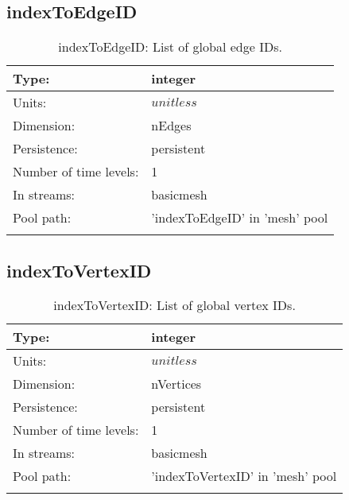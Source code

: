 \subsection[indexToEdgeID]{indexToEdgeID}
\label{subsec:var_sec_mesh_indexToEdgeID}
\begin{center}
\begin{longtable}{| p{2.0in} | p{4.0in} |}
        \hline 
        Type: & integer \\
        \hline 
        Units: & $unitless$ \\
        \hline 
        Dimension: & nEdges \\
        \hline 
        Persistence: & persistent \\
        \hline 
        Number of time levels: & 1 \\
        \hline 
		 In streams: &  basicmesh \\
        \hline 
            Pool path: & 'indexToEdgeID' in 'mesh' pool
 \\
		 \hline 
    \caption{indexToEdgeID: List of global edge IDs.}
\end{longtable}
\end{center}
\subsection[indexToVertexID]{indexToVertexID}
\label{subsec:var_sec_mesh_indexToVertexID}
\begin{center}
\begin{longtable}{| p{2.0in} | p{4.0in} |}
        \hline 
        Type: & integer \\
        \hline 
        Units: & $unitless$ \\
        \hline 
        Dimension: & nVertices \\
        \hline 
        Persistence: & persistent \\
        \hline 
        Number of time levels: & 1 \\
        \hline 
		 In streams: &  basicmesh \\
        \hline 
            Pool path: & 'indexToVertexID' in 'mesh' pool
 \\
		 \hline 
    \caption{indexToVertexID: List of global vertex IDs.}
\end{longtable}
\end{center}
